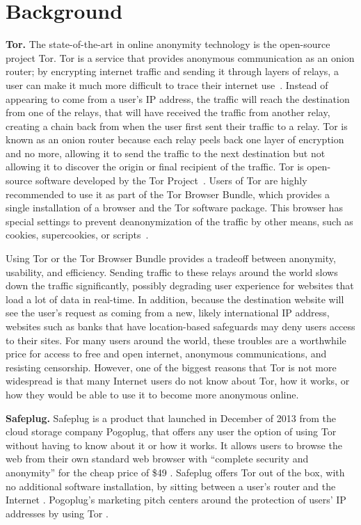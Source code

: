 \documentclass[conference]{IEEEtran}
\begin{document}
\section{Background}
{\bf Tor.} The state-of-the-art in online anonymity technology is the open-source project Tor.  Tor is a service that provides anonymous communication as an onion router; by encrypting internet traffic and sending it through layers of relays, a user can make it much more difficult to trace their internet use~\cite{tor}.  Instead of appearing to come from a user's IP address, the traffic will reach the destination from one of the relays, that will have received the traffic from another relay, creating a chain back from when the user first sent their traffic to a relay.  Tor is known as an onion router because each relay peels back one layer of encryption and no more, allowing it to send the traffic to the next destination but not allowing it to discover the origin or final recipient of the traffic.  Tor is open-source software developed by the Tor Project~\cite{torproject}.  Users of Tor are highly recommended to use it as part of the Tor Browser Bundle, which provides a single installation of a browser and the Tor software package.  This browser has special settings to prevent deanonymization of the traffic by other means, such as cookies, supercookies, or scripts~\cite{torproject}.

Using Tor or the Tor Browser Bundle provides a tradeoff between anonymity, usability, and efficiency.  Sending traffic to these relays around the world slows down the traffic significantly, possibly degrading user experience for websites that load a lot of data in real-time.  In addition, because the destination website will see the user's request as coming from a new, likely international IP address, websites such as banks that have location-based safeguards may deny users access to their sites.  For many users around the world, these troubles are a worthwhile price for access to free and open internet, anonymous communications, and resisting censorship.  However, one of the biggest reasons that Tor is not more widespread is that many Internet users do not know about Tor, how it works, or how they would be able to use it to become more anonymous online.

{\bf Safeplug.} Safeplug is a product that launched in December of 2013 from the cloud storage company Pogoplug, that offers any user the option of using Tor without having to know about it or how it works.  It allows users to browse the web from their own standard web browser with “complete security and anonymity” for the cheap price of \$49 \cite{safeplug}.  Safeplug offers Tor out of the box, with no additional software installation, by sitting between a user's router and the Internet \cite{wired}.  Pogoplug's marketing pitch centers around the protection of users' IP addresses by using Tor \cite{safeplug,bittech}.
\end{document}
